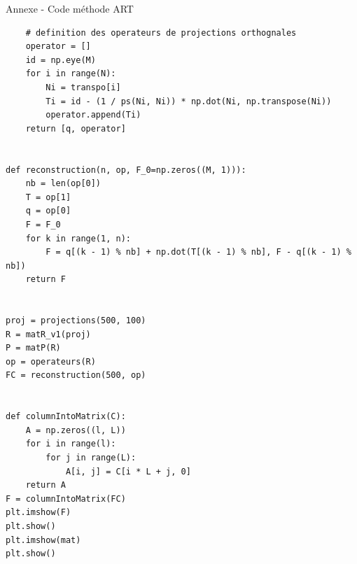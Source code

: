 \documentclass{beamer}
\begin{document}
\begin{frame}{Annexe - Code méthode ART}
\begin{lstlisting}
    # definition des operateurs de projections orthognales
    operator = []
    id = np.eye(M)
    for i in range(N):
        Ni = transpo[i]
        Ti = id - (1 / ps(Ni, Ni)) * np.dot(Ni, np.transpose(Ni))
        operator.append(Ti)
    return [q, operator]


def reconstruction(n, op, F_0=np.zeros((M, 1))):
    nb = len(op[0])
    T = op[1]
    q = op[0]
    F = F_0
    for k in range(1, n):
        F = q[(k - 1) % nb] + np.dot(T[(k - 1) % nb], F - q[(k - 1) % nb])
    return F


proj = projections(500, 100)
R = matR_v1(proj)
P = matP(R)
op = operateurs(R)
FC = reconstruction(500, op)


def columnIntoMatrix(C):
    A = np.zeros((l, L))
    for i in range(l):
        for j in range(L):
            A[i, j] = C[i * L + j, 0]
    return A
F = columnIntoMatrix(FC)
plt.imshow(F)
plt.show()
plt.imshow(mat)
plt.show()
    \end{lstlisting}
\end{frame}
\end{document}
